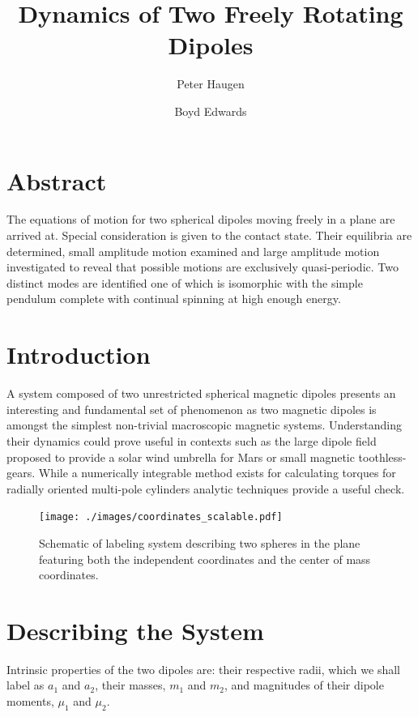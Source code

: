 \documentclass[prbg,preprint]{revtex4-1}
\begin{document}
\title{Dynamics of Two Freely Rotating Dipoles}
\author{Peter Haugen}
\author{Boyd Edwards}

\maketitle

\section{Abstract}
	The equations of motion for two spherical dipoles moving freely in a plane are arrived at. Special consideration is given to the contact state. Their equilibria are determined, small amplitude motion examined and large amplitude motion investigated to reveal that possible motions are exclusively quasi-periodic.
	Two distinct modes are identified one of which is isomorphic with the simple pendulum complete with continual spinning at high enough energy.
	
\section{Introduction}
A system composed of two unrestricted spherical magnetic dipoles presents an interesting and fundamental set of phenomenon as two magnetic dipoles is amongst the simplest non-trivial macroscopic magnetic systems. Understanding their dynamics could prove useful in contexts such as the large dipole field proposed to provide a solar wind umbrella for Mars\cite{2017LPICo1989.8250G} or small magnetic toothless-gears\cite{doi:10.1119/1.5029823}.
While a numerically integrable method exists for calculating torques for radially oriented multi-pole cylinders\cite{Furlani:1995aa}  analytic techniques provide a useful check.

\begin{figure}[h]
  \centering
  \texttt{[image: ./images/coordinates\_scalable.pdf]}
  \caption{Schematic of labeling system describing two spheres in the plane featuring both the independent coordinates and the center of mass coordinates.}
\end{figure}


\section{Describing the System}
Intrinsic properties of the two dipoles are: their respective radii, which we shall label as $a_1$ and $a_2$, their masses, $m_1$ and $m_2$, and magnitudes of their dipole moments, $\mu_1$ and $\mu_2$.
\end{document}
